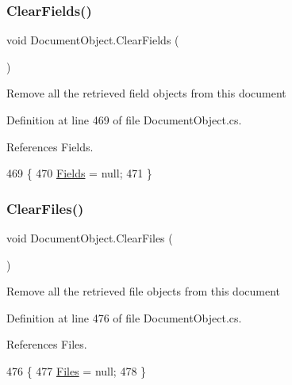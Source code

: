 \subsubsection{\texorpdfstring{Clear\+Fields()}{ClearFields()}}
{\footnotesize\ttfamily void Document\+Object.\+Clear\+Fields (\begin{DoxyParamCaption}{ }\end{DoxyParamCaption})}



Remove all the retrieved field objects from this document 



Definition at line 469 of file Document\+Object.\+cs.



References Fields.


\begin{DoxyCode}
469                               \{
470         \mbox{\hyperlink{class_document_object_ae203b8a3e40b6c428145d2335b71245c}{Fields}} = null;
471     \}
\end{DoxyCode}
\mbox{\label{class_document_object_a4caebae7aec2a9375112739d2cf29f29}} 
\subsubsection{\texorpdfstring{Clear\+Files()}{ClearFiles()}}
{\footnotesize\ttfamily void Document\+Object.\+Clear\+Files (\begin{DoxyParamCaption}{ }\end{DoxyParamCaption})}



Remove all the retrieved file objects from this document 



Definition at line 476 of file Document\+Object.\+cs.



References Files.


\begin{DoxyCode}
476                              \{
477         \mbox{\hyperlink{class_document_object_afe6bcf5175607f91dde768491f23a0a4}{Files}} = null;
478     \}
\end{DoxyCode}
\mbox{\label{class_document_object_a1a763aa01710b370634f46c89b7d2d8e}} 
